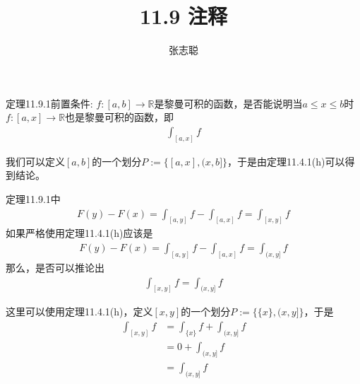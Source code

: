 \documentclass{article}
\begin{document}
\title{11.9 注释}
\author{张志聪}
\maketitle

\begin{zremark}
  定理11.9.1前置条件: $f: [a, b] \to \mathbb{R}$是黎曼可积的函数，是否能说明当$a \leq x \leq b$时
  $f: [a, x] \to \mathbb{R}$也是黎曼可积的函数，即
  \begin{align*}
    \int_{[a, x]} f
  \end{align*}
\end{zremark}
我们可以定义$[a,b]$的一个划分$P := \{[a,x], (x, b]\}$，于是由定理11.4.1(h)可以得到结论。

\begin{zremark}
  定理11.9.1中
  \begin{align*}
    F(y) - F(x) = \int_{[a,y]} f - \int_{[a,x]} f = \int_{[x,y]} f
  \end{align*}
  如果严格使用定理11.4.1(h)应该是
  \begin{align*}
    F(y) - F(x) = \int_{[a,y]} f - \int_{[a,x]} f = \int_{(x,y]} f
  \end{align*}
  那么，是否可以推论出
  \begin{align*}
    \int_{[x,y]} f = \int_{(x,y]} f
  \end{align*}
\end{zremark}
这里可以使用定理11.4.1(h)，定义$[x,y]$的一个划分$ P:= \{\{x\}, (x,y]\}$，于是
\begin{align*}
  \int_{[x,y]} f & = \int_{\{x\}} f + \int_{(x,y]} f \\
                 & = 0 + \int_{(x,y]} f \\
                 & = \int_{(x,y]} f
\end{align*}
\end{document}
